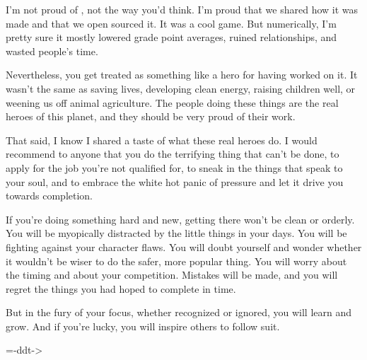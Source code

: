 I'm not proud of \doom{}, not the way you'd think.  I'm proud that we shared how it was made and that we open sourced it.  It was a cool game.  But numerically, I'm pretty sure it mostly lowered grade point averages, ruined relationships, and wasted people's time.\\
\par
Nevertheless, you get treated as something like a hero for having worked on it.  It wasn't the same as saving lives, developing clean energy, raising children well, or weening us off animal agriculture.  The people doing these things are the real heroes of this planet, and they should be very proud of their work.\\
\par
That said, I know I shared a taste of what these real heroes do.  I would recommend to anyone that you do the terrifying thing that can't be done, to apply for the job you're not qualified for, to sneak in the things that speak to your soul, and to embrace the white hot panic of pressure and let it drive you towards completion.\\
\par
If you're doing something hard and new, getting there won't be clean or orderly.  You will be myopically distracted by the little things in your days.  You will be fighting against your character flaws.  You will doubt yourself and wonder whether it wouldn't be wiser to do the safer, more popular thing.  You will worry about the timing and about your competition.  Mistakes will be made, and you will regret the things you had hoped to complete in time.\\
\par
But in the fury of your focus, whether recognized or ignored, you will learn and grow.  And if you're lucky, you will inspire others to follow suit.\\
\par
        =-ddt->\\
\par
